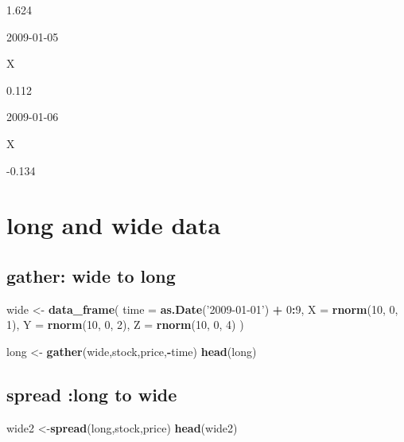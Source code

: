 \documentclass[]{book}
\newenvironment{Shaded}{\begin{snugshade}}{\end{snugshade}}
\newcommand{\DataTypeTok}[1]{\textcolor[rgb]{0.13,0.29,0.53}{#1}}
\newcommand{\DecValTok}[1]{\textcolor[rgb]{0.00,0.00,0.81}{#1}}
\newcommand{\KeywordTok}[1]{\textcolor[rgb]{0.13,0.29,0.53}{\textbf{#1}}}
\newcommand{\NormalTok}[1]{#1}
\newcommand{\OperatorTok}[1]{\textcolor[rgb]{0.81,0.36,0.00}{\textbf{#1}}}
\newcommand{\StringTok}[1]{\textcolor[rgb]{0.31,0.60,0.02}{#1}}
\theoremstyle{definition}
\theoremstyle{definition}
\theoremstyle{definition}
\theoremstyle{remark}
\begin{document}
1.624

2009-01-05

X

0.112

2009-01-06

X

-0.134

\hypertarget{long-and-wide-data}{%
\section{long and wide data}\label{long-and-wide-data}}

\hypertarget{gather-wide-to-long}{%
\subsection{gather: wide to long}\label{gather-wide-to-long}}

\begin{Shaded}
\begin{Highlighting}[]
\NormalTok{wide <-}\StringTok{ }\KeywordTok{data_frame}\NormalTok{(}
  \DataTypeTok{time =} \KeywordTok{as.Date}\NormalTok{(}\StringTok{'2009-01-01'}\NormalTok{) }\OperatorTok{+}\StringTok{ }\DecValTok{0}\OperatorTok{:}\DecValTok{9}\NormalTok{,}
  \DataTypeTok{X =} \KeywordTok{rnorm}\NormalTok{(}\DecValTok{10}\NormalTok{, }\DecValTok{0}\NormalTok{, }\DecValTok{1}\NormalTok{),}
  \DataTypeTok{Y =} \KeywordTok{rnorm}\NormalTok{(}\DecValTok{10}\NormalTok{, }\DecValTok{0}\NormalTok{, }\DecValTok{2}\NormalTok{),}
  \DataTypeTok{Z =} \KeywordTok{rnorm}\NormalTok{(}\DecValTok{10}\NormalTok{, }\DecValTok{0}\NormalTok{, }\DecValTok{4}\NormalTok{)}
\NormalTok{)}

\NormalTok{long <-}\StringTok{ }\KeywordTok{gather}\NormalTok{(wide,stock,price,}\OperatorTok{-}\NormalTok{time)}
\KeywordTok{head}\NormalTok{(long)}
\end{Highlighting}
\end{Shaded}

\hypertarget{spread-long-to-wide}{%
\subsection{spread :long to wide}\label{spread-long-to-wide}}

\begin{Shaded}
\begin{Highlighting}[]
\NormalTok{wide2 <-}\KeywordTok{spread}\NormalTok{(long,stock,price)}
\KeywordTok{head}\NormalTok{(wide2)}
\end{Highlighting}
\end{Shaded}
\end{document}
